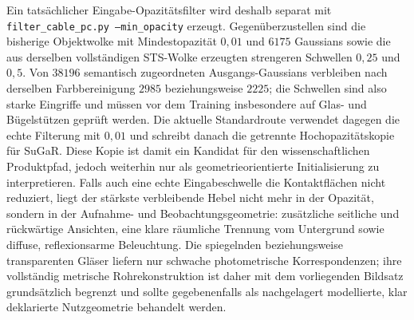 \documentclass[12pt,a4paper]{article}
\begin{document}
Ein tatsächlicher Eingabe-Opazitätsfilter wird deshalb separat mit \texttt{filter\_cable\_pc.py --min\_opacity} erzeugt. Gegenüberzustellen sind die bisherige Objektwolke mit Mindestopazität $0{,}01$ und $6175$ Gaussians sowie die aus derselben vollständigen STS-Wolke erzeugten strengeren Schwellen $0{,}25$ und $0{,}5$. Von $38196$ semantisch zugeordneten Ausgangs-Gaussians verbleiben nach derselben Farbbereinigung $2985$ beziehungsweise $2225$; die Schwellen sind also starke Eingriffe und müssen vor dem Training insbesondere auf Glas- und Bügelstützen geprüft werden. Die aktuelle Standardroute verwendet dagegen die echte Filterung mit $0{,}01$ und schreibt danach die getrennte Hochopazitätskopie für SuGaR. Diese Kopie ist damit ein Kandidat für den wissenschaftlichen Produktpfad, jedoch weiterhin nur als geometrieorientierte Initialisierung zu interpretieren. Falls auch eine echte Eingabeschwelle die Kontaktflächen nicht reduziert, liegt der stärkste verbleibende Hebel nicht mehr in der Opazität, sondern in der Aufnahme- und Beobachtungsgeometrie: zusätzliche seitliche und rückwärtige Ansichten, eine klare räumliche Trennung vom Untergrund sowie diffuse, reflexionsarme Beleuchtung. Die spiegelnden beziehungsweise transparenten Gläser liefern nur schwache photometrische Korrespondenzen; ihre vollständig metrische Rohrekonstruktion ist daher mit dem vorliegenden Bildsatz grundsätzlich begrenzt und sollte gegebenenfalls als nachgelagert modellierte, klar deklarierte Nutzgeometrie behandelt werden.
\end{document}
